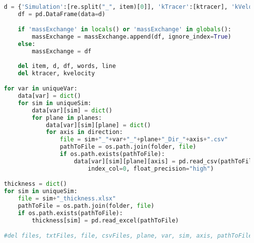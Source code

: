 \begin{lstlisting}[language=python]
    d = {'Simulation':[re.split("_", item)[0]], 'kTracer':[ktracer], 'kVelocity':[kvelocity]}
    df = pd.DataFrame(data=d)

    if 'massExchange' in locals() or 'massExchange' in globals():
        massExchange = massExchange.append(df, ignore_index=True)
    else:
        massExchange = df
        
    del item, d, df, words, line
    del ktracer, kvelocity

for var in uniqueVar:
    data[var] = dict()
    for sim in uniqueSim:
        data[var][sim] = dict()
        for plane in planes:
            data[var][sim][plane] = dict()
            for axis in direction:
                file = sim+"_"+var+"_"+plane+"_Dir_"+axis+".csv"
                pathToFile = os.path.join(folder, file)
                if os.path.exists(pathToFile):
                    data[var][sim][plane][axis] = pd.read_csv(pathToFile,\
                        index_col=0, float_precision="high")

thickness = dict()
for sim in uniqueSim:
    file = sim+"_thickness.xlsx"
    pathToFile = os.path.join(folder, file)
    if os.path.exists(pathToFile):
        thickness[sim] = pd.read_excel(pathToFile)

#del files, txtFiles, file, csvFiles, plane, var, sim, axis, pathToFile, direction

\end{lstlisting}
